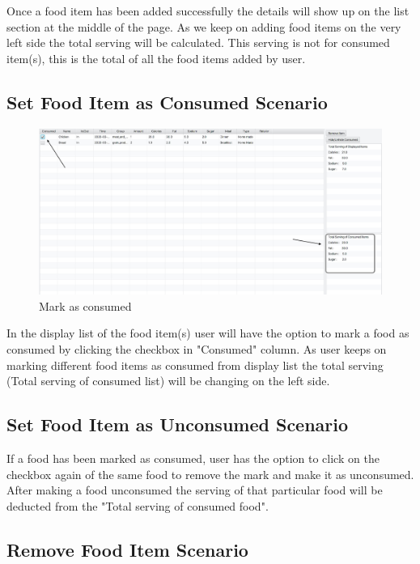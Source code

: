 \documentclass{scrreprt}
\begin{document}
\begin{enumerate}
\FloatBarrier
\end{enumerate}

Once a food item has been added successfully the details will show up on the list section at the middle of the page. As we keep on adding food items on the very left side the total serving will be calculated. This serving is not for consumed item(s), this is the total of all the food items added by user.
\pagebreak
\subsection{Set Food Item as Consumed Scenario}

\begin{figure}[!htbp]
\centering
\includegraphics[width=15cm]{pictures/consumed.png}
\caption*{Mark as consumed}
\end{figure}

\FloatBarrier

In the display list of the food item(s) user will have the option to mark a food as consumed by clicking the checkbox in "Consumed" column. As user keeps on marking different food items as consumed from display list the total serving (Total serving of consumed list) will be changing on the left side.

\subsection{Set Food Item as Unconsumed Scenario}

If a food has been marked as consumed, user has the option to click on the checkbox again of the same food to remove the mark and make it as unconsumed. After making a food unconsumed the serving of that particular food will be deducted from the "Total serving of consumed food".

\subsection{Remove Food Item Scenario}
\end{document}
